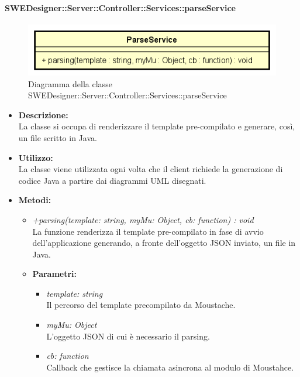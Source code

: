       \paragraph{SWEDesigner::Server::Controller::Services::parseService}
      	\begin{figure}[h!]
		\centering
		\includegraphics[scale=0.8]{Classi/ParseService.png}
		\caption{Diagramma della classe SWEDesigner::Server::Controller::Services::parseService}
 		\end{figure}
        \begin{itemize}
          \item \textbf{Descrizione:}\\
          La classe si occupa di renderizzare il template pre-compilato e generare, così, un file scritto in Java.
          \item \textbf{Utilizzo:}\\
          La classe viene utilizzata ogni volta che il client richiede la generazione di codice Java a partire dai diagrammi UML disegnati.
          \item \textbf{Metodi:}\\
          \begin{itemize}
            \item \emph{+parsing(template: string, myMu: Object, cb: function) : void}\\
            La funzione renderizza il template pre-compilato in fase di avvio dell'applicazione generando, a fronte dell'oggetto JSON inviato, un file in Java.
            \item \textbf{Parametri: }\\
            \begin{itemize}
              \item \emph{template: string}\\
              Il percorso del template precompilato da Moustache.
              \item \emph{myMu: Object}\\
              L'oggetto JSON di cui è necessario il parsing.
              \item \emph{cb: function}\\
              Callback che gestisce la chiamata asincrona al modulo di Moustahce.
            \end{itemize}
        \end{itemize}
       \end{itemize}
